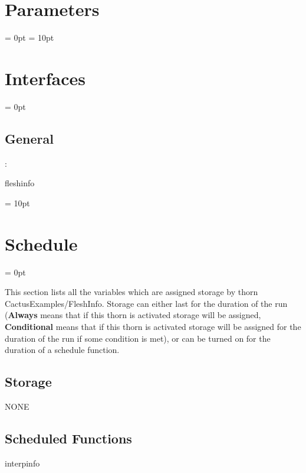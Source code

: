 \documentclass{article}
\begin{document}



\section{Parameters} 


\parskip = 0pt
\parskip = 10pt 

\section{Interfaces} 


\parskip = 0pt

\vspace{3mm} \subsection*{General}

: 

fleshinfo
\vspace{2mm}

\vspace{5mm}\parskip = 10pt 

\section{Schedule} 


\parskip = 0pt


\noindent This section lists all the variables which are assigned storage by thorn CactusExamples/FleshInfo.  Storage can either last for the duration of the run ({\bf Always} means that if this thorn is activated storage will be assigned, {\bf Conditional} means that if this thorn is activated storage will be assigned for the duration of the run if some condition is met), or can be turned on for the duration of a schedule function.


\subsection*{Storage}NONE
\subsection*{Scheduled Functions}
\vspace{5mm}


\hspace{5mm} interpinfo 
\end{document}

